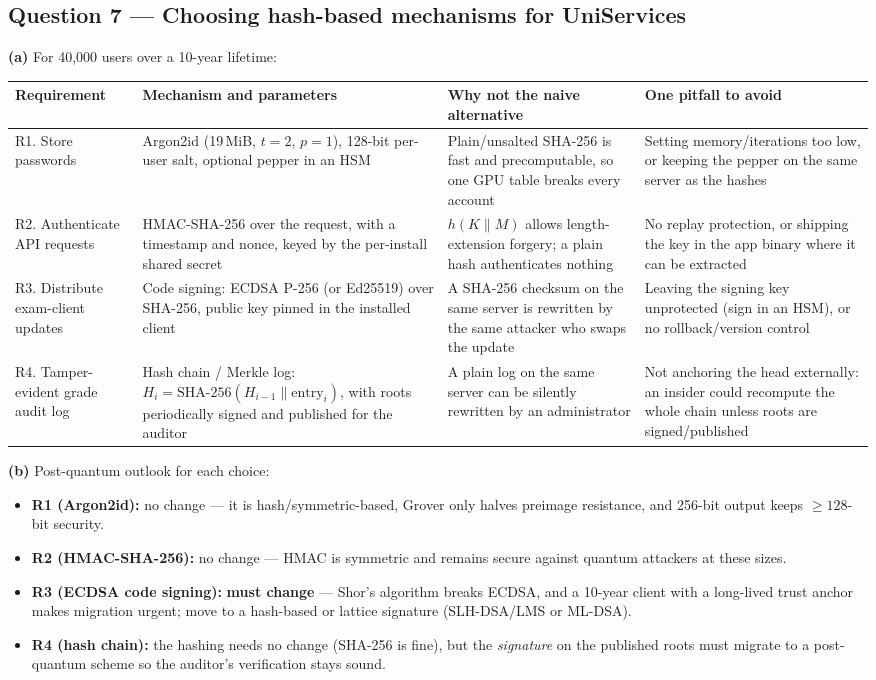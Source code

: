 \documentclass[11pt,a4paper]{article}
\begin{document}
\subsection*{Question 7 --- Choosing hash-based mechanisms for UniServices}
\textbf{(a)} For 40{,}000 users over a 10-year lifetime:
\begin{table}[H]
\centering\small
\begin{tabularx}{\textwidth}{@{}P{2.2cm}P{4.3cm}LP{3.1cm}@{}}
\toprule
Requirement & Mechanism and parameters & Why not the naive alternative & One pitfall to avoid \\
\midrule
R1. Store passwords & Argon2id (19\,MiB, $t=2$, $p=1$), 128-bit per-user salt, optional pepper in an HSM \cite{owasp} & Plain/unsalted SHA-256 is fast and precomputable, so one GPU table breaks every account & Setting memory/iterations too low, or keeping the pepper on the same server as the hashes \\
R2. Authenticate API requests & HMAC-SHA-256 over the request, with a timestamp and nonce, keyed by the per-install shared secret & $h(K\|M)$ allows length-extension forgery; a plain hash authenticates nothing & No replay protection, or shipping the key in the app binary where it can be extracted \\
R3. Distribute exam-client updates & Code signing: ECDSA P-256 (or Ed25519) over SHA-256, public key pinned in the installed client & A SHA-256 checksum on the same server is rewritten by the same attacker who swaps the update & Leaving the signing key unprotected (sign in an HSM), or no rollback/version control \\
R4. Tamper-evident grade audit log & Hash chain / Merkle log: $H_i=\mathrm{SHA\text{-}256}(H_{i-1}\|\text{entry}_i)$, with roots periodically signed and published for the auditor & A plain log on the same server can be silently rewritten by an administrator & Not anchoring the head externally: an insider could recompute the whole chain unless roots are signed/published \\
\bottomrule
\end{tabularx}
\end{table}

\textbf{(b)} Post-quantum outlook for each choice:
\begin{itemize}
\item \textbf{R1 (Argon2id):} no change --- it is hash/symmetric-based, Grover only halves preimage
resistance, and 256-bit output keeps $\ge 128$-bit security.
\item \textbf{R2 (HMAC-SHA-256):} no change --- HMAC is symmetric and remains secure against quantum
attackers at these sizes.
\item \textbf{R3 (ECDSA code signing):} \textbf{must change} --- Shor's algorithm breaks ECDSA, and a
10-year client with a long-lived trust anchor makes migration urgent; move to a hash-based or
lattice signature (SLH-DSA/LMS or ML-DSA).
\item \textbf{R4 (hash chain):} the hashing needs no change (SHA-256 is fine), but the \emph{signature}
on the published roots must migrate to a post-quantum scheme so the auditor's verification stays sound.
\end{itemize}
\end{document}
